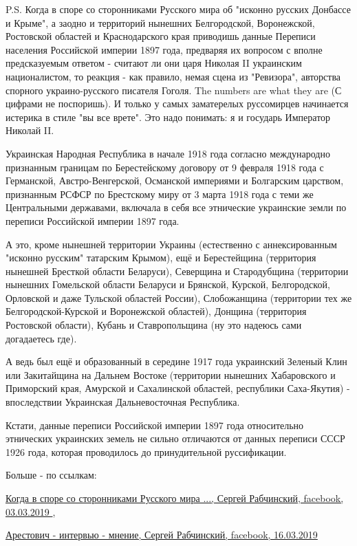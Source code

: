 \begin{itemize}
P.S. Когда в споре со сторонниками Русского мира об "исконно русских Донбассе и
Крыме", а заодно и территорий нынешних Белгородской, Воронежской, Ростовской
областей и Краснодарского края приводишь данные Переписи населения Российской
империи 1897 года, предваряя их вопросом с вполне предсказуемым ответом -
считают ли они царя Николая II украинским националистом, то реакция - как
правило, немая сцена из "Ревизора", авторства спорного украино-русского
писателя Гоголя. The numbers are what they are (С цифрами не поспоришь). И
только у самых заматерелых руссомирцев начинается истерика в стиле "вы все
врете". Это надо понимать: я и государь Император Николай II.

Украинская Народная Республика в начале 1918 года согласно международно
признанным границам по Берестейскому договору от 9 февраля 1918 года с
Германской, Австро-Венгерской, Османской империями и Болгарским царством,
признанным РСФСР по Брестскому миру от 3 марта 1918 года с теми же Центральными
державами, включала в себя все этнические украинские земли по переписи
Российской империи 1897 года.

А это, кроме нынешней территории Украины (естественно с аннексированным
"исконно русским" татарским Крымом), ещё и Берестейщина (территория нынешней
Бресткой области Беларуси), Северщина и Стародубщина (территории нынешних
Гомельской области Беларуси и Брянской, Курской, Белгородской, Орловской и даже
Тульской областей России), Слобожанщина (территории тех же Белгородской-Курской
и Воронежской областей), Донщина (территория Ростовской области), Кубань и
Ставропольщина (ну это надеюсь сами догадаетесь где).

А ведь был ещё и образованный в середине 1917 года украинский Зеленый Клин или
Закитайщина на Дальнем Востоке (территории нынешних Хабаровского и Приморский
края, Амурской и Сахалинской областей, республики Саха-Якутия) - впоследствии
Украинская Дальневосточная Республика.

Кстати, данные переписи Российской империи 1897 года относительно этнических
украинских земель не сильно отличаются от данных переписи СССР 1926 года,
которая проводилось до принудительной руссификации.

Больше - по ссылкам: 

\href{https://www.facebook.com/100017678566688/posts/363940834205199?sfns=mo}{
Когда в споре со сторонниками Русского мира ..., Сергей Рабчинский, facebook, %
03.03.2019%
}
, 

\href{https://www.facebook.com/100017678566688/posts/369151777017438?sfns=mo}{%
Арестович - интервью - мнение, Сергей Рабчинский, facebook,%
16.03.2019%
}


\end{itemize}
